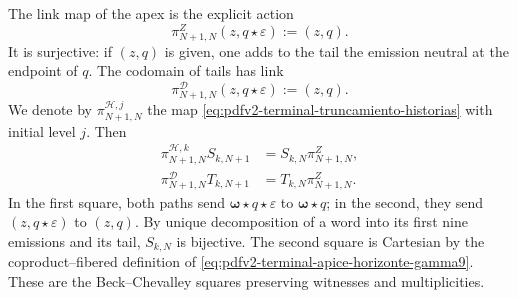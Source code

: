 The link map of the apex is the explicit action
\begin{equation}
\label{eq:pdfv2-terminal-gamma9-enlace-apice}
 \pi^Z_{N+1,N}(z,q\star\varepsilon):=(z,q).
\end{equation}
It is surjective: if \((z,q)\) is given, one adds to the tail the emission
neutral at the endpoint of \(q\). The codomain of tails has link
\begin{equation}
\label{eq:pdfv2-terminal-gamma9-enlace-codominio}
 \pi^{\mathscr D}_{N+1,N}(z,q\star\varepsilon):=(z,q).
\end{equation}
We denote by
\(\pi^{\mathscr H,j}_{N+1,N}\) the map
\eqref{eq:pdfv2-terminal-truncamiento-historias} with initial level \(j\).
Then
\begin{align}
 \pi^{\mathscr H,k}_{N+1,N}S_{k,N+1}
 &=S_{k,N}\pi^Z_{N+1,N},
 \label{eq:pdfv2-terminal-gamma9-cuadrado-fuente}\\
 \pi^{\mathscr D}_{N+1,N}T_{k,N+1}
 &=T_{k,N}\pi^Z_{N+1,N}.
 \label{eq:pdfv2-terminal-gamma9-cuadrado-destino}
\end{align}
In the first square, both paths send
\(\boldsymbol\omega\star q\star\varepsilon\) to
\(\boldsymbol\omega\star q\); in the second, they send
\((z,q\star\varepsilon)\) to \((z,q)\). By unique decomposition of a word
into its first nine emissions and its tail, \(S_{k,N}\) is bijective. The
second square is Cartesian by the coproduct--fibered definition of
\eqref{eq:pdfv2-terminal-apice-horizonte-gamma9}. These are the
Beck--Chevalley squares preserving witnesses and multiplicities.


